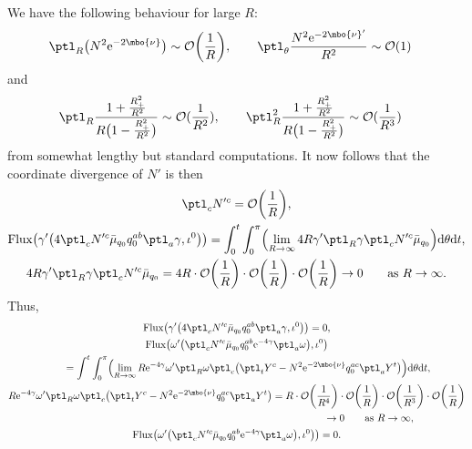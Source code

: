 We have the following behaviour for large $R$:
\begin{align*}
& \ptl_R \bigl(N^2 {\rm e}^{-2 \mbo{\nu}}\bigr) \sim \mathcal{O}\biggl(\frac{1}{R}\biggr),
\qquad \ptl_\theta \frac{N^2 {\rm e}^{-2 \mbo{\nu}'}}{R^2} \sim \mathcal{O} (1)
\end{align*}
and
\begin{align*}
& \ptl_R \frac{ 1 + \frac{R^2_+}{R^2}}{ R \bigl(1- \frac{R^2_+}{R^2}\bigr)} \sim \mathcal{O} (\frac{1}{R^2}), \qquad \ptl^2_R \frac{ 1 + \frac{R^2_+}{R^2}}{ R \bigl(1- \frac{R^2_+}{R^2}\bigr)} \sim \mathcal{O} (\frac{1}{R^3})
\end{align*}
from somewhat lengthy but standard computations. It now follows that the coordinate divergence of $N'$ is then
\begin{gather*}
\ptl_c N'^c = \mathcal{O} \biggl(\frac{1}{R}\biggr),
\\
{\rm Flux} \bigl(\gamma' \bigl(4 \ptl_c N'^c \bar{\mu}_{q_0} q^{ab} _0 \ptl_a \gamma, \iota^0\bigr)\bigr) =
\int^t_0 \int^\pi_0 \Bigl(\lim_{R \to \infty} 4 R \gamma' \ptl_R \gamma \ptl_c N'^c \bar{\mu}_{q_0}\Bigr) {\rm d} \theta {\rm d}t,
\\
4 R \gamma' \ptl_R \gamma \ptl_c N'^c \bar{\mu}_{q_0} = 4 R \cdot \mathcal{O} \biggl(\frac{1}{R}\biggr) \cdot \mathcal{O} \biggl(\frac{1}{R}\biggr) \cdot \mathcal{O} \biggl(\frac{1}{R}\biggr)
 \to 0 \qquad \text{as} \ R \to \infty.
\end{gather*}
Thus,
\begin{gather*}
{\rm Flux} \bigl(\gamma' \bigl(4 \ptl_c N'^c \bar{\mu}_{q_0} q^{ab} _0 \ptl_a \gamma, \iota^0\bigr)\bigr) =0,
\\
{\rm Flux} \bigl(\omega' \bigl(\ptl_c N'^c \bar{\mu}_{q_0} q^{ab} _0 {\rm e}^{-4 \gamma} \ptl_a \omega\bigr), \iota^0\bigr) \notag\\
 \qquad{} = \int^t \int^\pi_0 \Bigl(\lim_{R \to \infty} R {\rm e}^{-4\gamma} \omega' \ptl_R \omega \ptl_c\bigl(\ptl_t Y^c - N^2 {\rm e}^{-2 \mbo{\nu}} q^{ac}_0 \ptl_a Y^t\bigr)\Bigr) {\rm d} \theta {\rm d}t,
\\
R {\rm e}^{-4\gamma} \omega' \ptl_R \omega \ptl_c\bigl(\ptl_t Y^c - N^2 {\rm e}^{-2 \mbo{\nu}} q^{ac}_0 \ptl_a Y^t\bigr) = R \cdot \mathcal{O} \biggl(\frac{1}{R^4}\biggr) \cdot \mathcal{O} \biggl(\frac{1}{R}\biggr) \cdot \mathcal{O} \biggl(\frac{1}{R^3}\biggr) \cdot \mathcal{O} \biggl(\frac{1}{R}\biggr) \notag\\
\hphantom{R {\rm e}^{-4\gamma} \omega' \ptl_R \omega \ptl_c\bigl(\ptl_t Y^c - N^2 {\rm e}^{-2 \mbo{\nu}} q^{ac}_0 \ptl_a Y^t\bigr)}{}
\to 0 \qquad \text{as} \ R \to \infty,
\\
{\rm Flux} \bigl(\omega' \bigl(\ptl_c N'^c \bar{\mu}_{q_0} q^{ab} _0 {\rm e}^{-4 \gamma} \ptl_a \omega\bigr), \iota^0\bigr)\bigr) =0.
\end{gather*}
